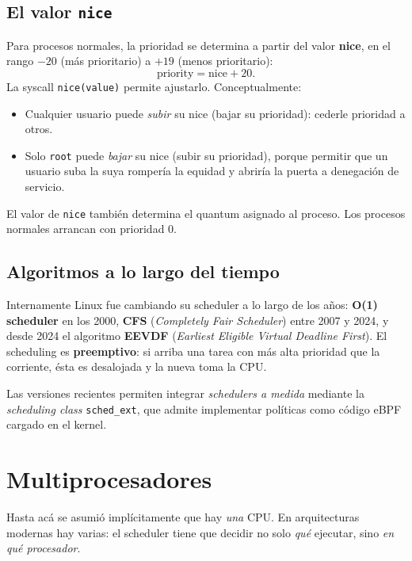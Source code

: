 \documentclass[11pt,a4paper]{article}
\begin{document}
\subsection{El valor \texttt{nice}}

Para procesos normales, la prioridad se determina a partir del valor
\textbf{nice}, en el rango $-20$ (más prioritario) a $+19$ (menos
prioritario):
\[
\text{priority} = \text{nice} + 20.
\]
La syscall \texttt{nice(value)} permite ajustarlo. Conceptualmente:
\begin{itemize}[leftmargin=*,nosep]
    \item Cualquier usuario puede \emph{subir} su nice (bajar su
        prioridad): cederle prioridad a otros.
    \item Solo \texttt{root} puede \emph{bajar} su nice (subir su
        prioridad), porque permitir que un usuario suba la suya
        rompería la equidad y abriría la puerta a denegación de
        servicio.
\end{itemize}
El valor de \texttt{nice} también determina el quantum asignado al
proceso. Los procesos normales arrancan con prioridad 0.

\subsection{Algoritmos a lo largo del tiempo}

Internamente Linux fue cambiando su scheduler a lo largo de los años:
\textbf{O(1) scheduler} en los 2000, \textbf{CFS} (\emph{Completely
Fair Scheduler}) entre 2007 y 2024, y desde 2024 el algoritmo
\textbf{EEVDF} (\emph{Earliest Eligible Virtual Deadline First}). El
scheduling es \textbf{preemptivo}: si arriba una tarea con más alta
prioridad que la corriente, ésta es desalojada y la nueva toma la
CPU.

Las versiones recientes permiten integrar \emph{schedulers a medida}
mediante la \emph{scheduling class} \texttt{sched\_ext}, que admite
implementar políticas como código eBPF cargado en el kernel.

\section{Multiprocesadores}

Hasta acá se asumió implícitamente que hay \emph{una} CPU. En
arquitecturas modernas hay varias: el scheduler tiene que decidir no
solo \emph{qué} ejecutar, sino \emph{en qué procesador}.
\end{document}
